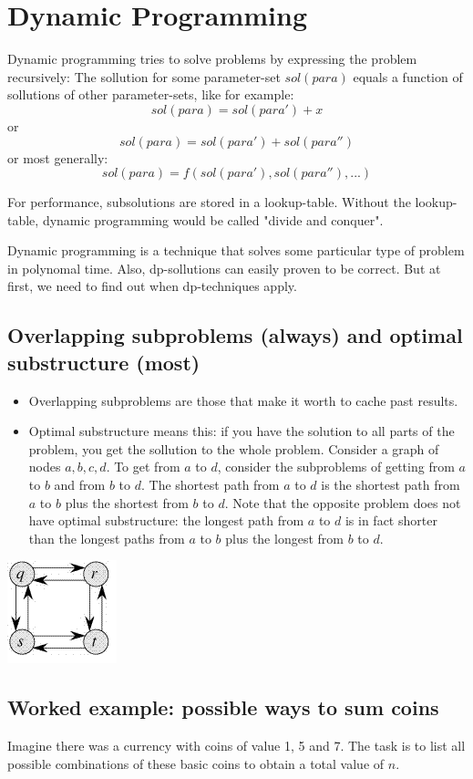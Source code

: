 \section{Dynamic Programming}

Dynamic programming tries to solve problems by expressing the problem recursively: The sollution for some parameter-set $sol(para)$ equals a function of sollutions of other parameter-sets, like for example: 
$$ sol(para) = sol(para') + x$$
or
$$ sol(para) = sol(para') + sol(para'')$$
or most generally:
$$ sol(para) = f(sol(para'), sol(para''), ...)$$

For performance, subsolutions are stored in a lookup-table. Without the lookup-table, dynamic programming would be called "divide and conquer".


Dynamic programming is a technique that solves some particular type of problem in polynomal time. Also, dp-sollutions can easily proven to be correct. But at first, we need to find out when dp-techniques apply. 

\subsection{Overlapping subproblems (always) and optimal substructure (most)}
\begin{itemize}
	\item Overlapping subproblems are those that make it worth to cache past results.
	\item Optimal substructure means this: if you have the solution to all parts of the problem, you get the sollution to the whole problem. 
	Consider a graph of nodes $a, b, c, d$. To get from $a$ to $d$, consider the subproblems of getting from $a$ to $b$ and from $b$ to $d$. 
	The shortest path from $a$ to $d$ is the shortest path from $a$ to $b$ plus the shortest from $b$ to $d$. 
	Note that the opposite problem does not have optimal substructure: the longest path from $a$ to $d$ is in fact shorter 
	than the longest paths from $a$ to $b$ plus the longest  from $b$ to $d$.
\end{itemize}
\includegraphics[width=0.2\linewidth]{images/LongestPath.png}

\subsection{Worked example: possible ways to sum coins}
Imagine there was a currency with coins of value 1, 5 and 7. The task is to list all possible combinations of these basic coins to obtain a total value of $n$.


